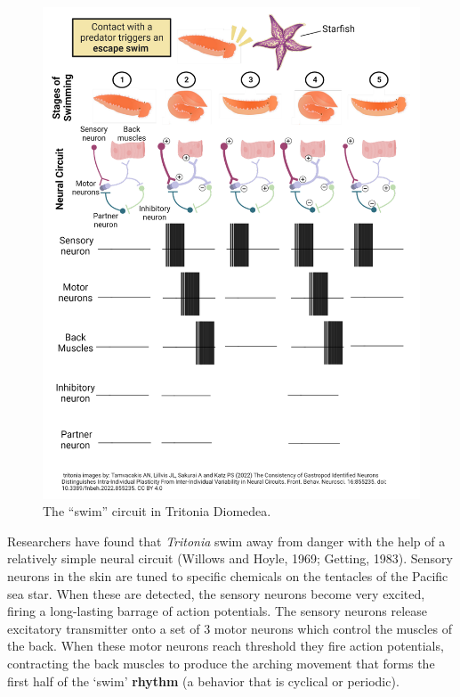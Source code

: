 \documentclass[
]{book}
\begin{document}
\begin{figure}

{\centering \includegraphics[width=0.9\linewidth]{images/ch02/02_07} 

}

\caption{The “swim” circuit in Tritonia Diomedea.}\label{fig:ch02-tritonia}
\end{figure}

Researchers have found that \emph{Tritonia} swim away from danger with the help of a relatively simple neural circuit (Willows and Hoyle, 1969; Getting, 1983). Sensory neurons in the skin are tuned to specific chemicals on the tentacles of the Pacific sea star. When these are detected, the sensory neurons become very excited, firing a long-lasting barrage of action potentials. The sensory neurons release excitatory transmitter onto a set of 3 motor neurons which control the muscles of the back. When these motor neurons reach threshold they fire action potentials, contracting the back muscles to produce the arching movement that forms the first half of the `swim' \textbf{rhythm }(a behavior that is cyclical or periodic).
\end{document}

